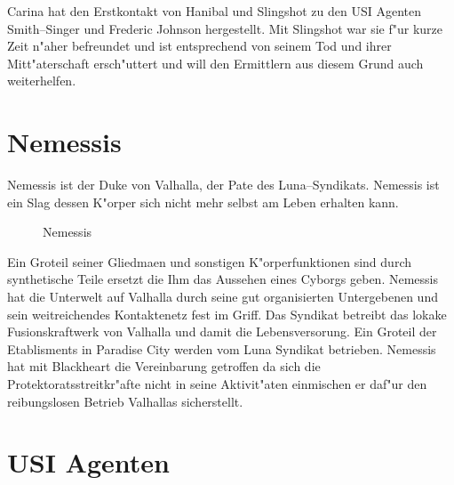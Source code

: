 Carina hat den Erstkontakt von Hanibal und Slingshot zu den USI Agenten Smith--Singer und Frederic Johnson hergestellt. Mit Slingshot war sie f"ur kurze Zeit n"aher befreundet und ist entsprechend von seinem Tod und ihrer Mitt"aterschaft ersch"uttert und will den Ermittlern 
aus diesem Grund auch weiterhelfen.

\section{Nemessis}

Nemessis ist der Duke von Valhalla, der Pate des Luna--Syndikats. Nemessis ist ein Slag dessen K"orper sich nicht mehr selbst am Leben erhalten kann. 

\begin{figure}
    \caption{Nemessis}
\end{figure}

Ein Gro\3teil seiner Gliedma\3en und sonstigen K"orperfunktionen sind durch synthetische Teile ersetzt die Ihm das Aussehen eines Cyborgs geben. Nemessis hat die Unterwelt auf Valhalla durch seine gut organisierten Untergebenen und sein weitreichendes Kontaktenetz
fest im Griff. Das Syndikat betreibt das lokake Fusionskraftwerk von Valhalla und damit die Lebensversorung. Ein Gro\3teil der Etablisments in Paradise City werden vom Luna Syndikat betrieben. Nemessis hat mit Blackheart die Vereinbarung getroffen da\3 sich die Protektoratsstreitkr"afte nicht in seine Aktivit"aten einmischen er daf"ur den reibungslosen Betrieb Valhallas sicherstellt.


\newpage
\section{USI Agenten}

